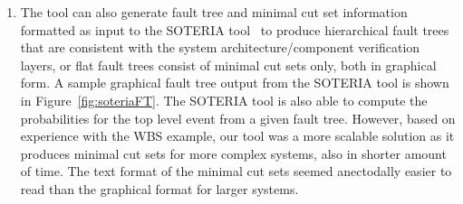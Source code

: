 \begin{enumerate}
\item The tool can also generate fault tree and minimal cut set information formatted as input to the SOTERIA tool~\cite{manolios2019model} to produce hierarchical fault trees that are consistent with the system architecture/component verification layers, or flat fault trees consist of minimal cut sets only, both in graphical form. A sample graphical fault tree output from the SOTERIA tool is shown in Figure~\ref{fig:soteriaFT}. The SOTERIA tool is also able to compute the probabilities for the top level event from a given fault tree. However, based on experience with the WBS example, our tool was a more scalable solution as it produces minimal cut sets for more complex systems, also in shorter amount of time. The text format of the minimal cut sets seemed anectodally easier to read than the graphical format for larger systems. 

\end{enumerate}
